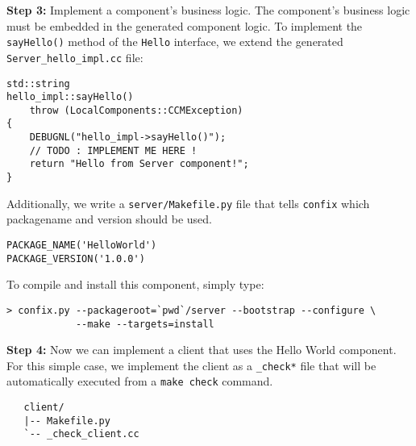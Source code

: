 \noindent
{\bf Step 3:} Implement a component's business logic.
The component's business logic must be embedded in the generated
component logic. 
To implement the {\tt sayHello()} method of the {\tt Hello} interface,
we extend the generated {\tt Server\_hello\_impl.cc} file:
\begin{small}
\begin{verbatim}
std::string
hello_impl::sayHello()
    throw (LocalComponents::CCMException)
{
    DEBUGNL("hello_impl->sayHello()");
    // TODO : IMPLEMENT ME HERE !
    return "Hello from Server component!";
}
\end{verbatim}
\end{small}

\noindent
Additionally, we write a {\tt server/Makefile.py} file that tells
{\tt confix} which packagename and version should be used.
\begin{small}
\begin{verbatim}
PACKAGE_NAME('HelloWorld')
PACKAGE_VERSION('1.0.0')
\end{verbatim}
\end{small}

\noindent
To compile and install this component, simply type: 
\begin{small}
\begin{verbatim}
> confix.py --packageroot=`pwd`/server --bootstrap --configure \
            --make --targets=install
\end{verbatim}
\end{small}


\noindent
{\bf Step 4:} Now we can implement a client that uses the Hello World
component. For this simple case, we implement the client as a {\tt \_check*}
file that will be automatically executed from a {\tt make check} command.

\begin{small}
\begin{verbatim}
   client/
   |-- Makefile.py
   `-- _check_client.cc
\end{verbatim}
\end{small}

